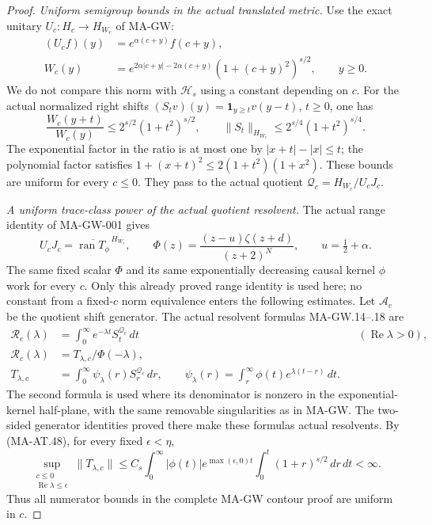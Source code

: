 \begin{proof}
\emph{Uniform semigroup bounds in the actual translated metric.}
Use the exact unitary \(U_c:H_c\to H_{W_c}\) of MA-GW:
\[
 \begin{aligned}
 (U_cf)(y)&=e^{\alpha(c+y)}f(c+y),\\
 W_c(y)&=e^{2\alpha|c+y|-2\alpha(c+y)}
                        (1+(c+y)^2)^{s/2},\qquad y\ge0.
 \end{aligned}
 \tag{MA-AT.47}
\]
We do not compare this norm with \(\mathcal H_s\) using a
constant depending on \(c\).
For the actual normalized right shifts
\((S_t v)(y)=\mathbf1_{y\ge t}v(y-t)\), \(t\ge0\), one has
\[
 \frac{W_c(y+t)}{W_c(y)}
 \le 2^{s/2}(1+t^2)^{s/2},\qquad
 \|S_t\|_{H_{W_c}}\le2^{s/4}(1+t^2)^{s/4}.
 \tag{MA-AT.48}
\]
The exponential factor in the ratio is at most one by
\(|x+t|-|x|\le t\); the polynomial factor satisfies
\(1+(x+t)^2\le2(1+t^2)(1+x^2)\).
These bounds are uniform for every \(c\le0\).
They pass to the actual quotient
\(\mathscr Q_c=H_{W_c}/U_cJ_c\).

\emph{A uniform trace-class power of the actual quotient resolvent.}
The actual range identity of MA-GW-001 gives
\[
 U_cJ_c=\overline{\operatorname{ran}T_\phi}^{\,H_{W_c}},
 \qquad
 \Phi(z)=\frac{(z-u)\zeta(z+d)}{(z+2)^N},\qquad
 u=\tfrac12+\alpha.
 \tag{MA-AT.49}
\]
The same fixed scalar \(\Phi\) and its same exponentially
decreasing causal kernel \(\phi\) work for every \(c\).
Only this already proved range identity is used here;
no constant from a fixed-\(c\) norm equivalence enters
the following estimates.
Let \(\mathscr A_c\) be the quotient shift generator.
The actual resolvent formulas MA-GW.14--.18 are
\[
 \begin{aligned}
 \mathscr R_c(\lambda)
   &=\int_0^\infty e^{-\lambda t}S_t^{\mathscr Q_c}\,dt
                       &&(\operatorname{Re}\lambda>0),\\
 \mathscr R_c(\lambda)
   &=T_{\lambda,c}/\Phi(-\lambda),\\
 T_{\lambda,c}
   &=\int_0^\infty\psi_\lambda(r)S_r^{\mathscr Q_c}\,dr,\qquad
 \psi_\lambda(r)=\int_r^\infty\phi(t)e^{\lambda(t-r)}\,dt .
 \end{aligned}
 \tag{MA-AT.50}
\]
The second formula is used where its denominator is nonzero
in the exponential-kernel half-plane, with the same removable
singularities as in MA-GW.  The two-sided generator identities
proved there make these formulas actual resolvents.
By (MA-AT.48), for every fixed \(\epsilon<\eta\),
\[
 \sup_{\substack{c\le0\\\operatorname{Re}\lambda\le\epsilon}}
       \|T_{\lambda,c}\|
 \le C_s\int_0^\infty |\phi(t)|e^{\max(\epsilon,0)t}
                   \int_0^t(1+r)^{s/2}\,dr\,dt<\infty .
 \tag{MA-AT.51}
\]
Thus all numerator bounds in the complete MA-GW contour proof
are uniform in \(c\).


\end{proof}
